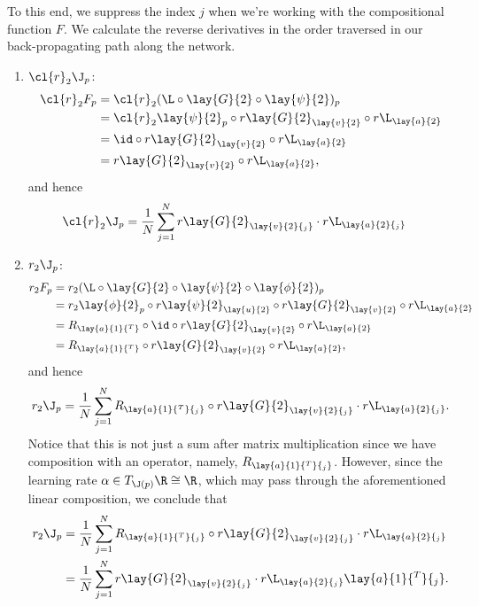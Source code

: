 To this end, we suppress the index $j$ when we're working with the compositional function $F$.  We calculate the reverse derivatives in the order traversed in our back-propagating path along the network.

\begin{enumerate}
	\item $\cl{r}_2\J_p$:
	\begin{align*}
		\cl{r}_2F_p&=\cl{r}_2(\L\circ\lay{G}{2}\circ\lay{\psi}{2})_p\\
		&=\cl{r}_2\lay{\psi}{2}_p\circ r\lay{G}{2}_{\lay{v}{2}}\circ r\L_{\lay{a}{2}}\\
		&=\id\circ r\lay{G}{2}_{\lay{v}{2}}\circ r\L_{\lay{a}{2}}\\
		&=r\lay{G}{2}_{\lay{v}{2}}\circ r\L_{\lay{a}{2}},
	\end{align*}
	and hence
	\begin{align*}
		\cl{r}_2\J_p&=\frac{1}{N}\sum_{j=1}^Nr\lay{G}{2}_{\lay{v}{2}{_j}}\cdot r\L_{\lay{a}{2}{_j}}
	\end{align*}
	
	\item $r_2\J_p$:
	\begin{align*}
		r_2F_p&=r_2(\L\circ\lay{G}{2}\circ\lay{\psi}{2}\circ\lay{\phi}{2})_p\\
		&=r_2\lay{\phi}{2}_p\circ r\lay{\psi}{2}_{\lay{u}{2}}\circ r\lay{G}{2}_{\lay{v}{2}}\circ r\L_{\lay{a}{2}}\\
		&=R_{\lay{a}{1}{^T}}\circ\id\circ r\lay{G}{2}_{\lay{v}{2}}\circ r\L_{\lay{a}{2}}\\
		&=R_{\lay{a}{1}{^T}}\circ r\lay{G}{2}_{\lay{v}{2}}\circ r\L_{\lay{a}{2}},
	\end{align*}
	and hence
	$$r_2\J_p=\frac{1}{N}\sum_{j=1}^NR_{\lay{a}{1}{^T}{_j}}\circ r\lay{G}{2}_{\lay{v}{2}{_j}}\cdot r\L_{\lay{a}{2}{_j}}.$$
	Notice that this is not just a sum after matrix multiplication since we have composition with an operator, namely, $R_{\lay{a}{1}{^T}{_j}}$.  However, since the learning rate $\alpha\in T_{\J(p)}\R\cong\R$, which may pass through the aforementioned linear composition, we conclude that
	\begin{align*}
		r_2\J_p&=\frac{1}{N}\sum_{j=1}^NR_{\lay{a}{1}{^T}{_j}}\circ r\lay{G}{2}_{\lay{v}{2}{_j}}\cdot r\L_{\lay{a}{2}{_j}}\\
		&=\frac{1}{N}\sum_{j=1}^Nr\lay{G}{2}_{\lay{v}{2}{_j}}\cdot r\L_{\lay{a}{2}{_j}}\lay{a}{1}{^T}{_j}.
	\end{align*}
	

\end{enumerate}
